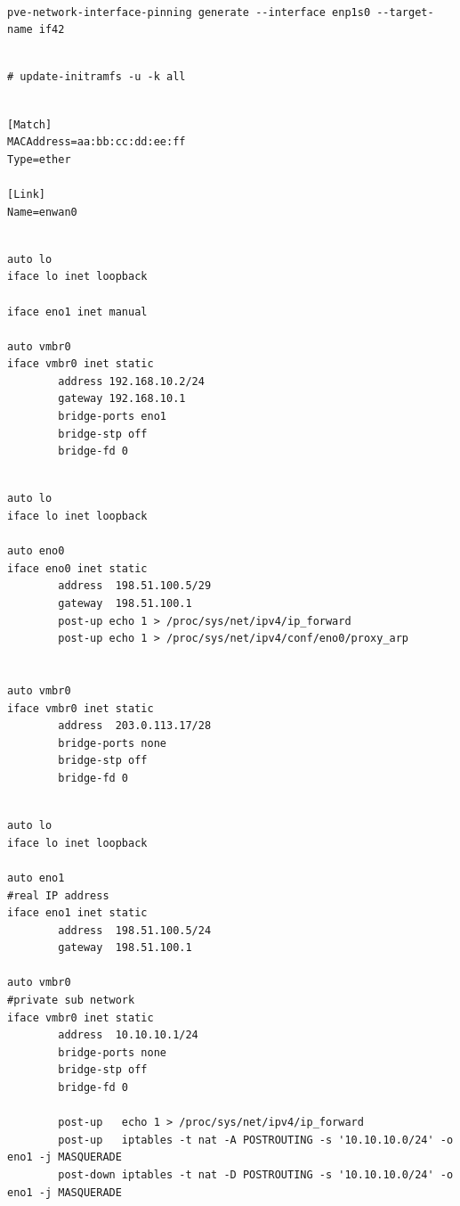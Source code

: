 \begin{lstlisting}

pve-network-interface-pinning generate --interface enp1s0 --target-name if42

\end{lstlisting}

\begin{lstlisting}

# update-initramfs -u -k all

\end{lstlisting}

\begin{lstlisting}

[Match]
MACAddress=aa:bb:cc:dd:ee:ff
Type=ether

[Link]
Name=enwan0

\end{lstlisting}

\begin{lstlisting}

auto lo
iface lo inet loopback

iface eno1 inet manual

auto vmbr0
iface vmbr0 inet static
        address 192.168.10.2/24
        gateway 192.168.10.1
        bridge-ports eno1
        bridge-stp off
        bridge-fd 0

\end{lstlisting}

\begin{lstlisting}

auto lo
iface lo inet loopback

auto eno0
iface eno0 inet static
        address  198.51.100.5/29
        gateway  198.51.100.1
        post-up echo 1 > /proc/sys/net/ipv4/ip_forward
        post-up echo 1 > /proc/sys/net/ipv4/conf/eno0/proxy_arp


auto vmbr0
iface vmbr0 inet static
        address  203.0.113.17/28
        bridge-ports none
        bridge-stp off
        bridge-fd 0

\end{lstlisting}

\begin{lstlisting}

auto lo
iface lo inet loopback

auto eno1
#real IP address
iface eno1 inet static
        address  198.51.100.5/24
        gateway  198.51.100.1

auto vmbr0
#private sub network
iface vmbr0 inet static
        address  10.10.10.1/24
        bridge-ports none
        bridge-stp off
        bridge-fd 0

        post-up   echo 1 > /proc/sys/net/ipv4/ip_forward
        post-up   iptables -t nat -A POSTROUTING -s '10.10.10.0/24' -o eno1 -j MASQUERADE
        post-down iptables -t nat -D POSTROUTING -s '10.10.10.0/24' -o eno1 -j MASQUERADE

\end{lstlisting}

